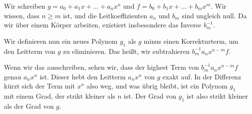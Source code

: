 \begin{spoken-clean}[00:24:30 - 00:28:00]
Wir schreiben $g = a_0 + a_1 x + \dots + a_n x^n$ und $f = b_0 + b_1 x + \dots + b_m x^m$. Wir wissen, dass $n \ge m$ ist, und die Leitkoeffizienten $a_n$ und $b_m$ sind ungleich null. Da wir über einem Körper arbeiten, existiert insbesondere das Inverse $b_m^{-1}$. 

Wir definieren nun ein neues Polynom $g_1$ als $g$ minus einen Korrekturterm, um den Leitterm von $g$ zu eliminieren. Das heißt, wir subtrahieren $b_m^{-1} a_n x^{n-m} f$. 

Wenn wir das ausschreiben, sehen wir, dass der highest Term von $b_m^{-1} a_n x^{n-m} f$ genau $a_n x^n$ ist. Dieser hebt den Leitterm $a_n x^n$ von $g$ exakt auf. In der Differenz kürzt sich der Term mit $x^n$ also weg, und was übrig bleibt, ist ein Polynom $g_1$ mit einem Grad, der strikt kleiner als $n$ ist. Der Grad von $g_1$ ist also strikt kleiner als der Grad von $g$.
\end{spoken-clean}

